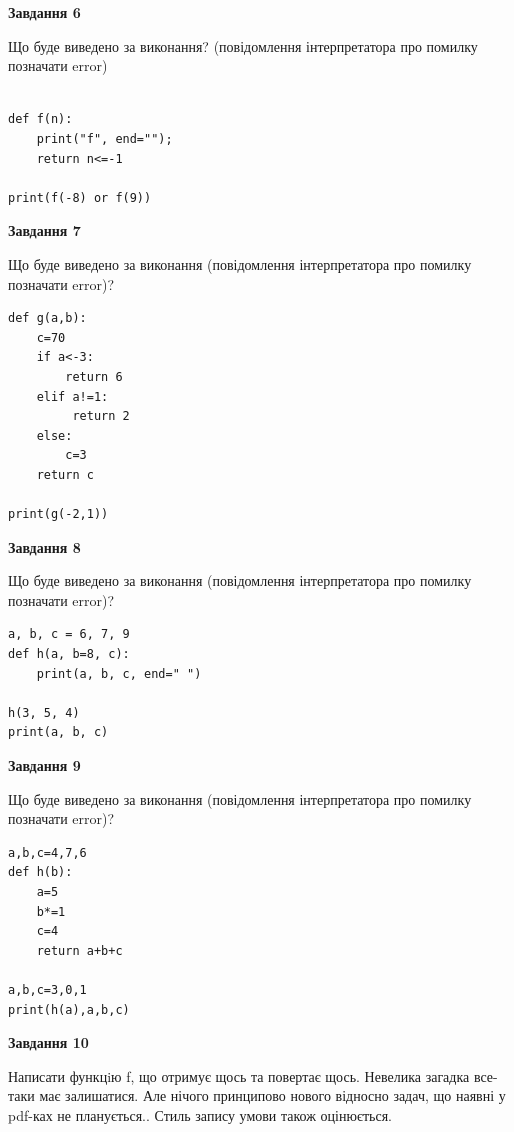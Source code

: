 \documentclass[12pt, ukrainian]{article}
\begin{document}
{\begin {large}
{\begin {center}\textbf{Завдання 6}\end {center}}

Що буде виведено за виконання? (повідомлення інтерпретатора про помилку позначати error)\par
\begin{verbatim}

def f(n):
    print("f", end="");
    return n<=-1

print(f(-8) or f(9))
\end{verbatim}

{\begin {center}\textbf{Завдання 7}\end {center}}

Що буде виведено за виконання (повідомлення інтерпретатора про помилку позначати error)?\par
\begin{verbatim}
def g(a,b):
    c=70
    if a<-3:
        return 6
    elif a!=1:
         return 2
    else: 
        c=3
    return c

print(g(-2,1))
\end{verbatim}

{\begin {center}\textbf{Завдання 8}\end {center}}

Що буде виведено за виконання (повідомлення інтерпретатора про помилку позначати error)?\par
\begin{verbatim}
a, b, c = 6, 7, 9
def h(a, b=8, c):
    print(a, b, c, end=" ")

h(3, 5, 4)
print(a, b, c)
\end{verbatim}

{\begin {center}\textbf{Завдання 9}\end {center}}

Що буде виведено за виконання (повідомлення інтерпретатора про помилку позначати error)?\par
\begin{verbatim}
a,b,c=4,7,6
def h(b):
    a=5
    b*=1
    c=4
    return a+b+c

a,b,c=3,0,1
print(h(a),a,b,c)
\end{verbatim}

{\begin {center}\textbf{Завдання 10}\end {center}}


Написати функцiю f, що отримує щось та повертає щось. Невелика загадка все-таки має залишатися. Але нічого принципово нового відносно задач, що наявні у pdf-ках не планується.. Стиль запису умови також оцінюється.\par
\end {large}}
\newpage
\end{document}
